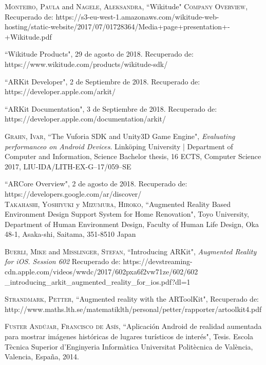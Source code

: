 \begin{thebibliography}{X}
	 \textsc{Monteiro, Paula} and \textsc{Nagele, Aleksandra}, ``Wikitude" \textsc{Company Overview}, Recuperado de: https://s3-eu-west-1.amazonaws.com/wikitude-web-hosting/static-website/2017/07/01728364/Media+page+presentation+-+Wikitude.pdf
	
	
	
	 ``Wikitude Products", 29 de agosto de 2018. Recuperado de: https://www.wikitude.com/products/wikitude-sdk/
	
	
	 ``ARKit Developer", 2 de Septiembre de 2018. Recuperado de:
	https://developer.apple.com/arkit/
	
	 ``ARKit Documentation", 3 de Septiembre de 2018. Recuperado de:
	https://developer.apple.com/documentation/arkit/
	
	
	 \textsc{Grahn, Ivar}, ``The Vuforia SDK and Unity3D Game Engine", \textit{Evaluating performanceo on Android Devices}. Linköping University | Department of Computer and Information, Science Bachelor thesis, 16 ECTS, Computer Science 2017, LIU-IDA/LITH-EX-G–17/059–SE
	
	
	 ``ARCore Overview", 2 de agosto de 2018. Recuperado de: https://developers.google.com/ar/discover/
	\\
	
	
	
	 \textsc{Takahashi, Yoshiyuki} y \textsc{Mizumura, Hiroko},
	``Augmented Reality Based Environment Design Support System for Home Renovation", Toyo  University, Department of Human Environment Design, Faculty of Human Life Design, Oka 48-1, Asaka-shi, Saitama, 351-8510 Japan 
	
	
	
	 \textsc{Buerli, Mike} and \textsc{Misslinger, Stefan}, ``Introducing ARKit", \textit{Augmented Reality for iOS. Session 602} Recuperado de: https://devstreaming-cdn.apple.com/videos/wwdc/2017/602pxa6f2vw71ze/602/602
	\_introducing\_arkit\_augmented\_reality\_for\_ios.pdf?dl=1
	
	 \textsc{Strandmark, Petter}, ``Augmented reality with the ARToolKit", Recuperado de: http://www.maths.lth.se/matematiklth/personal/petter/rapporter/artoolkit4.pdf
	
	 \textsc{Fuster Andújar, Francisco de Asís}, ``Aplicación Android de realidad aumentada para mostrar imágenes históricas de lugares turísticos de interés", Tesis. Escola Tècnica Superior d’Enginyeria Informàtica Universitat Politècnica de València, Valencia, España, 2014.
	

\end{thebibliography}
